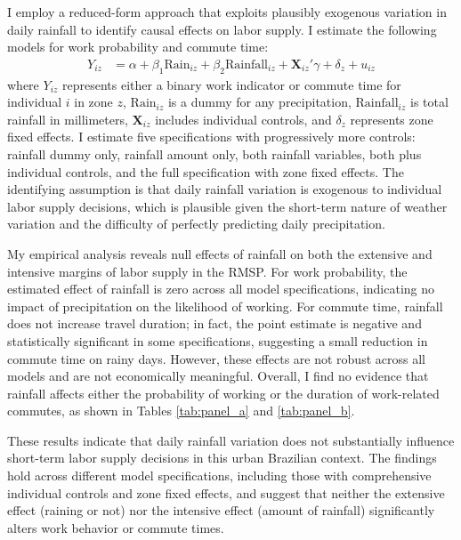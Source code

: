 I employ a reduced-form approach that exploits plausibly exogenous variation in daily rainfall to identify causal effects on labor supply. I estimate the following models for work probability and commute time:
\begin{align*}
Y_{iz} &= \alpha + \beta_1 \text{Rain}_{iz} + \beta_2 \text{Rainfall}_{iz} + \mathbf{X}_{iz}'\gamma + \delta_z + u_{iz}
\end{align*}
where $Y_{iz}$ represents either a binary work indicator or commute time for individual $i$ in zone $z$, $\text{Rain}_{iz}$ is a dummy for any precipitation, $\text{Rainfall}_{iz}$ is total rainfall in millimeters, $\mathbf{X}_{iz}$ includes individual controls, and $\delta_z$ represents zone fixed effects. I estimate five specifications with progressively more controls: rainfall dummy only, rainfall amount only, both rainfall variables, both plus individual controls, and the full specification with zone fixed effects. The identifying assumption is that daily rainfall variation is exogenous to individual labor supply decisions, which is plausible given the short-term nature of weather variation and the difficulty of perfectly predicting daily precipitation.

My empirical analysis reveals null effects of rainfall on both the extensive and intensive margins of labor supply in the RMSP. For work probability, the estimated effect of rainfall is zero across all model specifications, indicating no impact of precipitation on the likelihood of working. For commute time, rainfall does not increase travel duration; in fact, the point estimate is negative and statistically significant in some specifications, suggesting a small reduction in commute time on rainy days. However, these effects are not robust across all models and are not economically meaningful. Overall, I find no evidence that rainfall affects either the probability of working or the duration of work-related commutes, as shown in Tables \ref{tab:panel_a} and \ref{tab:panel_b}.




These results indicate that daily rainfall variation does not substantially influence short-term labor supply decisions in this urban Brazilian context. The findings hold across different model specifications, including those with comprehensive individual controls and zone fixed effects, and suggest that neither the extensive effect (raining or not) nor the intensive effect (amount of rainfall) significantly alters work behavior or commute times.  

